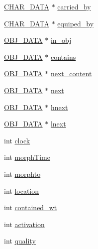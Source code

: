 \begin{DoxyCompactItemize}
\item 
\hyperlink{structs_8h_af33ed1e66e8541a08bed257124f50f31}{C\-H\-A\-R\-\_\-\-D\-A\-T\-A} $\ast$ \hyperlink{structobj__data_a0388d60f29d6a628dbad79bf22b649f0}{carried\-\_\-by}
\item 
\hyperlink{structs_8h_af33ed1e66e8541a08bed257124f50f31}{C\-H\-A\-R\-\_\-\-D\-A\-T\-A} $\ast$ \hyperlink{structobj__data_a80ed7ef3f58646168c9c876596d4abcd}{equiped\-\_\-by}
\item 
\hyperlink{structs_8h_aaa59141dfc8c6ecdb6bfcf1537dd52d1}{O\-B\-J\-\_\-\-D\-A\-T\-A} $\ast$ \hyperlink{structobj__data_af59c06024e274536220978e2bc0c591d}{in\-\_\-obj}
\item 
\hyperlink{structs_8h_aaa59141dfc8c6ecdb6bfcf1537dd52d1}{O\-B\-J\-\_\-\-D\-A\-T\-A} $\ast$ \hyperlink{structobj__data_ab751c8aaa66dcb3c08b364060c13d7b3}{contains}
\item 
\hyperlink{structs_8h_aaa59141dfc8c6ecdb6bfcf1537dd52d1}{O\-B\-J\-\_\-\-D\-A\-T\-A} $\ast$ \hyperlink{structobj__data_a5ffcda8d82a9ab6bd7ff8c322f09f6dd}{next\-\_\-content}
\item 
\hyperlink{structs_8h_aaa59141dfc8c6ecdb6bfcf1537dd52d1}{O\-B\-J\-\_\-\-D\-A\-T\-A} $\ast$ \hyperlink{structobj__data_a58d99df34e9afce44fc932f1a9c597c7}{next}
\item 
\hyperlink{structs_8h_aaa59141dfc8c6ecdb6bfcf1537dd52d1}{O\-B\-J\-\_\-\-D\-A\-T\-A} $\ast$ \hyperlink{structobj__data_a1d635528083bf56b438a01972af0d0d1}{hnext}
\item 
\hyperlink{structs_8h_aaa59141dfc8c6ecdb6bfcf1537dd52d1}{O\-B\-J\-\_\-\-D\-A\-T\-A} $\ast$ \hyperlink{structobj__data_ac8b5a49f9617372420673567198f4740}{lnext}
\item 
int \hyperlink{structobj__data_a31e1c7ba26a3cd211fdd2fb3bde8ef0f}{clock}
\item 
int \hyperlink{structobj__data_a6df7fa77cc759e9b838bc1ab84fdd8cc}{morph\-Time}
\item 
int \hyperlink{structobj__data_a7cba3b623ae437c8ea67430eb04a71a3}{morphto}
\item 
int \hyperlink{structobj__data_abd67647986e9284a69af6c4bd1ce2edc}{location}
\item 
int \hyperlink{structobj__data_a196e608f0a50abd16d5e0a436f0e234d}{contained\-\_\-wt}
\item 
int \hyperlink{structobj__data_a2c61309f316be645ac769b4a2c82c13d}{activation}
\item 
int \hyperlink{structobj__data_ac3b63e6e55780379997d9d8011e91ca9}{quality}
\item 

\end{DoxyCompactItemize}
